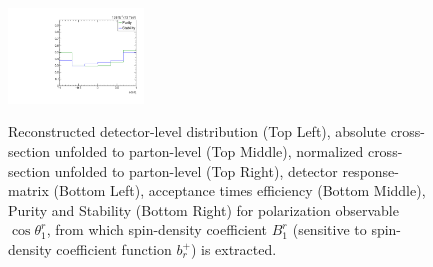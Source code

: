 \begin{figure}[htb]
\begin{center}
 \includegraphics[width=0.32\textwidth]{fig_fullRun2UL/unfolding/combined/PurStab_b1r.pdf} \\
\caption{Reconstructed detector-level distribution (Top Left), absolute cross-section unfolded to parton-level (Top Middle), normalized cross-section unfolded to parton-level (Top Right), detector response-matrix (Bottom Left), acceptance times efficiency (Bottom Middle), Purity and Stability (Bottom Right) for polarization observable $\cos\theta_{1}^{r}$, from which spin-density coefficient $B_{1}^{r}$ (sensitive to spin-density coefficient function $b_r^{+}$) is extracted.}
\label{fig:b1r}
\end{center}
\end{figure}
\clearpage
